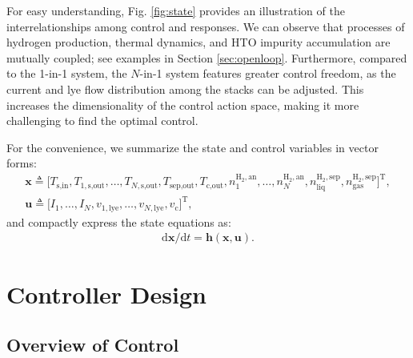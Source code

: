 \documentclass[review,3p,10pt]{elsarticle}
\begin{document}
For easy understanding, Fig. \ref{fig:state} provides an illustration of the interrelationships among control and responses.
We can observe that processes of hydrogen production, thermal dynamics, and HTO impurity accumulation are mutually coupled; %
see examples in Section \ref{sec:openloop}.
Furthermore, compared to the 1-in-1 system, the $N$-in-1 system features greater control freedom, as the current and lye flow distribution among the stacks can be adjusted. This increases the dimensionality of the control action space, making it more challenging to find the optimal control.

For the convenience, %
we summarize the state and control variables in vector forms:
\begin{gather}
  \bm{x} \triangleq \big[ T_{\text{s,in}}, T_{1,\text{s,out}}, \ldots, T_{N,\text{s,out}}, T_{\text{sep,out}}, T_{\text{c,out}}, n_1^{\text{H}_2,\text{an}}, \ldots, n_N^{\text{H}_2,\text{an}}, n_{\text{liq}}^{\text{H}_2,\text{sep}}  , n_{\text{gas}}^{\text{H}_2,\text{sep}} \big]^{\text{T}}, \label{eq:state} \\
  \bm{u}  \triangleq \big[  I_1, \ldots, I_N, v_{1,\text{lye}}, \ldots, v_{N,\text{lye}}, v_\text{c} \big]^{\text{T}}, \label{eq:control}
\end{gather}
\noindent
and compactly express the state equations as:
\begin{align}
  {\text{d}\bm{x}}/{\text{d}t} = \bm{h}(\bm{x}, \bm{u}). \label{eq:equstate}
\end{align}

\section{Controller Design}
\label{sec:control}

\subsection{Overview of Control}
\end{document}
